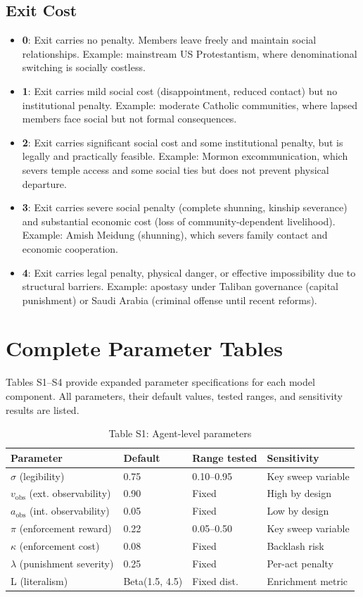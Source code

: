 \documentclass[12pt]{article}
\begin{document}
\subsection{Exit Cost}

\begin{itemize}
\item \textbf{0}: Exit carries no penalty. Members leave freely and maintain social relationships. Example: mainstream US Protestantism, where denominational switching is socially costless.
\item \textbf{1}: Exit carries mild social cost (disappointment, reduced contact) but no institutional penalty. Example: moderate Catholic communities, where lapsed members face social but not formal consequences.
\item \textbf{2}: Exit carries significant social cost and some institutional penalty, but is legally and practically feasible. Example: Mormon excommunication, which severs temple access and some social ties but does not prevent physical departure.
\item \textbf{3}: Exit carries severe social penalty (complete shunning, kinship severance) and substantial economic cost (loss of community-dependent livelihood). Example: Amish Meidung (shunning), which severs family contact and economic cooperation.
\item \textbf{4}: Exit carries legal penalty, physical danger, or effective impossibility due to structural barriers. Example: apostasy under Taliban governance (capital punishment) or Saudi Arabia (criminal offense until recent reforms).
\end{itemize}


\section{Complete Parameter Tables}

Tables S1--S4 provide expanded parameter specifications for each model component. All parameters, their default values, tested ranges, and sensitivity results are listed.

\begin{table}[h]
\centering
\caption{Table S1: Agent-level parameters}
\begin{tabular}{llll}
\toprule
Parameter & Default & Range tested & Sensitivity \\
\midrule
$\sigma$ (legibility) & 0.75 & 0.10--0.95 & Key sweep variable \\
$v_{\text{obs}}$ (ext. observability) & 0.90 & Fixed & High by design \\
$a_{\text{obs}}$ (int. observability) & 0.05 & Fixed & Low by design \\
$\pi$ (enforcement reward) & 0.22 & 0.05--0.50 & Key sweep variable \\
$\kappa$ (enforcement cost) & 0.08 & Fixed & Backlash risk \\
$\lambda$ (punishment severity) & 0.25 & Fixed & Per-act penalty \\
L (literalism) & Beta(1.5, 4.5) & Fixed dist. & Enrichment metric \\
\bottomrule
\end{tabular}
\end{table}
\end{document}
